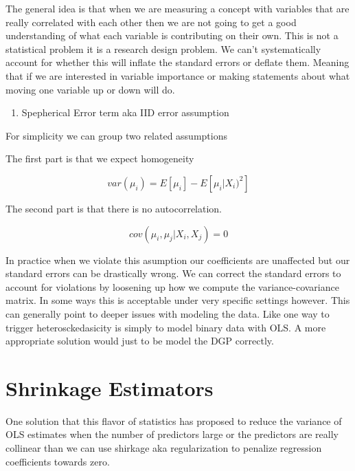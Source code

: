 \documentclass[
  letterpaper,
  DIV=11,
  numbers=noendperiod]{scrreprt}
\providecommand{\tightlist}{%
  \setlength{\itemsep}{0pt}\setlength{\parskip}{0pt}}\usepackage{longtable,booktabs,array}
\begin{document}
The general idea is that when we are measuring a concept with variables
that are really correlated with each other then we are not going to get
a good understanding of what each variable is contributing on their own.
This is not a statistical problem it is a research design problem. We
can't systematically account for whether this will inflate the standard
errors or deflate them. Meaning that if we are interested in variable
importance or making statements about what moving one variable up or
down will do.

\begin{enumerate}
\def\labelenumi{\arabic{enumi}.}
\setcounter{enumi}{2}
\tightlist
\item
  Spepherical Error term aka IID error assumption
\end{enumerate}

For simplicity we can group two related assumptions

The first part is that we expect homogeneity

\[
\begin{equation}
  var(\mu_i) = E[\mu_i] - E[\mu_i | X_i)^2]
\end{equation}
\]

The second part is that there is no autocorrelation.

\[
\begin{equation}
  cov(\mu_i, \mu_j | X_i, X_j) = 0
\end{equation}
\]

In practice when we violate this asumption our coefficients are
unaffected but our standard errors can be drastically wrong. We can
correct the standard errors to account for violations by loosening up
how we compute the variance-covariance matrix. In some ways this is
acceptable under very specific settings however. This can generally
point to deeper issues with modeling the data. Like one way to trigger
heterosckedasicity is simply to model binary data with OLS. A more
appropriate solution would just to be model the DGP correctly.

\section{Shrinkage Estimators}\label{shrinkage-estimators}

One solution that this flavor of statistics has proposed to reduce the
variance of OLS estimates when the number of predictors large or the
predictors are really collinear than we can use shirkage aka
regularization to penalize regression coefficients towards zero.
\end{document}
